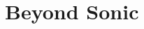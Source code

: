 \documentclass[11pt,oneside]{article}
\theoremstyle{definition}
\theoremstyle{remark}
\numberwithin{equation}{section}
\begin{document}
\section{Beyond Sonic}\label{sec:improv}





\end{document}
